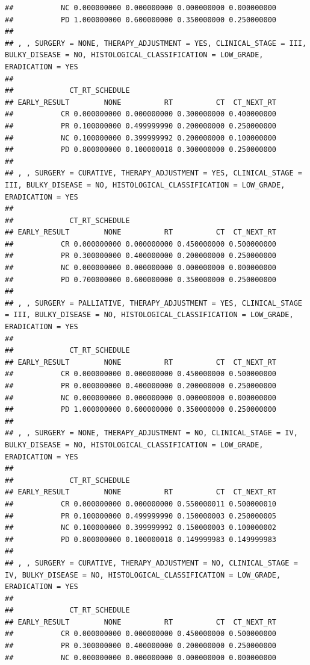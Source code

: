 \documentclass[]{article}
\begin{document}
\begin{verbatim}
##           NC 0.000000000 0.000000000 0.000000000 0.000000000
##           PD 1.000000000 0.600000000 0.350000000 0.250000000
## 
## , , SURGERY = NONE, THERAPY_ADJUSTMENT = YES, CLINICAL_STAGE = III, BULKY_DISEASE = NO, HISTOLOGICAL_CLASSIFICATION = LOW_GRADE, ERADICATION = YES
## 
##             CT_RT_SCHEDULE
## EARLY_RESULT        NONE          RT          CT  CT_NEXT_RT
##           CR 0.000000000 0.000000000 0.300000000 0.400000000
##           PR 0.100000000 0.499999990 0.200000000 0.250000000
##           NC 0.100000000 0.399999992 0.200000000 0.100000000
##           PD 0.800000000 0.100000018 0.300000000 0.250000000
## 
## , , SURGERY = CURATIVE, THERAPY_ADJUSTMENT = YES, CLINICAL_STAGE = III, BULKY_DISEASE = NO, HISTOLOGICAL_CLASSIFICATION = LOW_GRADE, ERADICATION = YES
## 
##             CT_RT_SCHEDULE
## EARLY_RESULT        NONE          RT          CT  CT_NEXT_RT
##           CR 0.000000000 0.000000000 0.450000000 0.500000000
##           PR 0.300000000 0.400000000 0.200000000 0.250000000
##           NC 0.000000000 0.000000000 0.000000000 0.000000000
##           PD 0.700000000 0.600000000 0.350000000 0.250000000
## 
## , , SURGERY = PALLIATIVE, THERAPY_ADJUSTMENT = YES, CLINICAL_STAGE = III, BULKY_DISEASE = NO, HISTOLOGICAL_CLASSIFICATION = LOW_GRADE, ERADICATION = YES
## 
##             CT_RT_SCHEDULE
## EARLY_RESULT        NONE          RT          CT  CT_NEXT_RT
##           CR 0.000000000 0.000000000 0.450000000 0.500000000
##           PR 0.000000000 0.400000000 0.200000000 0.250000000
##           NC 0.000000000 0.000000000 0.000000000 0.000000000
##           PD 1.000000000 0.600000000 0.350000000 0.250000000
## 
## , , SURGERY = NONE, THERAPY_ADJUSTMENT = NO, CLINICAL_STAGE = IV, BULKY_DISEASE = NO, HISTOLOGICAL_CLASSIFICATION = LOW_GRADE, ERADICATION = YES
## 
##             CT_RT_SCHEDULE
## EARLY_RESULT        NONE          RT          CT  CT_NEXT_RT
##           CR 0.000000000 0.000000000 0.550000011 0.500000010
##           PR 0.100000000 0.499999990 0.150000003 0.250000005
##           NC 0.100000000 0.399999992 0.150000003 0.100000002
##           PD 0.800000000 0.100000018 0.149999983 0.149999983
## 
## , , SURGERY = CURATIVE, THERAPY_ADJUSTMENT = NO, CLINICAL_STAGE = IV, BULKY_DISEASE = NO, HISTOLOGICAL_CLASSIFICATION = LOW_GRADE, ERADICATION = YES
## 
##             CT_RT_SCHEDULE
## EARLY_RESULT        NONE          RT          CT  CT_NEXT_RT
##           CR 0.000000000 0.000000000 0.450000000 0.500000000
##           PR 0.300000000 0.400000000 0.200000000 0.250000000
##           NC 0.000000000 0.000000000 0.000000000 0.000000000

\end{verbatim}
\end{document}
